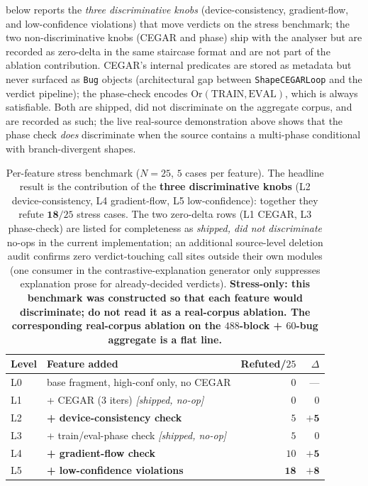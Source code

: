  below reports the
\emph{three discriminative knobs} (device-consistency,
gradient-flow, and low-confidence violations) that move
verdicts on the stress benchmark; the two non-discriminative
knobs (CEGAR and phase) ship with the analyser but are recorded
as zero-delta in the same staircase format and are not part of
the ablation contribution. CEGAR's internal predicates are stored
as metadata but never surfaced as \texttt{Bug} objects
(architectural gap between \texttt{ShapeCEGARLoop} and the verdict
pipeline); the phase-check encodes
$\mathrm{Or}(\mathrm{TRAIN},\mathrm{EVAL})$, which is always
satisfiable. Both are shipped, did not discriminate on the
aggregate corpus, and are recorded as such; the live
real-source demonstration above shows that the phase check
\emph{does} discriminate when the source contains a
multi-phase conditional with branch-divergent shapes.

\begin{table}[t]
\centering\small\setlength{\tabcolsep}{6pt}
\caption{Per-feature stress benchmark ($N{=}25$, $5$ cases per feature).
The headline result is the contribution of the
\textbf{three discriminative knobs} (L2 device-consistency,
L4 gradient-flow, L5 low-confidence): together they refute
$\mathbf{18}/25$ stress cases. The two zero-delta rows
(L1 CEGAR, L3 phase-check) are listed for completeness as
\emph{shipped, did not discriminate} no-ops in the current
implementation; an additional source-level deletion audit
confirms zero verdict-touching call sites outside their own
modules (one consumer in the contrastive-explanation generator
only suppresses explanation prose for already-decided verdicts).
\textbf{Stress-only: this benchmark was constructed so that each
feature would discriminate; do not read it as a real-corpus ablation.
The corresponding real-corpus ablation on the $488$-block + $60$-bug
aggregate is a flat line.}}
\label{tab:ablation}
\begin{tabular}{l l rr}
\toprule
Level & Feature added & Refuted/$25$ & $\Delta$ \\
\midrule
L0 & base fragment, high-conf only, no CEGAR & $0$ & --- \\
L1 & + CEGAR (3 iters) \emph{[shipped, no-op]}        & $0$ & $0$ \\
L2 & \textbf{+ device-consistency check}              & $5$ & $\mathbf{+5}$ \\
L3 & + train/eval-phase check \emph{[shipped, no-op]} & $5$ & $0$ \\
L4 & \textbf{+ gradient-flow check}                   & $10$& $\mathbf{+5}$ \\
L5 & \textbf{+ low-confidence violations}             & $\mathbf{18}$& $\mathbf{+8}$ \\
\bottomrule
\end{tabular}
\end{table}

